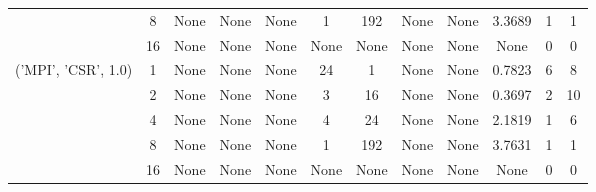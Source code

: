 \begin{tabular}{cccccccccccc}
& 8& None& None& None& 1& 192& None& None& 3.3689& 1& 1\\
& 16& None& None& None& None& None& None& None& None& 0& 0\\
\hline
\multirow{5}{*}{('MPI', 'CSR', 1.0)}& 1& None& None& None& 24& 1& None& None& 0.7823& 6& 8\\
& 2& None& None& None& 3& 16& None& None& 0.3697& 2& 10\\
& 4& None& None& None& 4& 24& None& None& 2.1819& 1& 6\\
& 8& None& None& None& 1& 192& None& None& 3.7631& 1& 1\\
& 16& None& None& None& None& None& None& None& None& 0& 0\\
\hline
\end{tabular}




